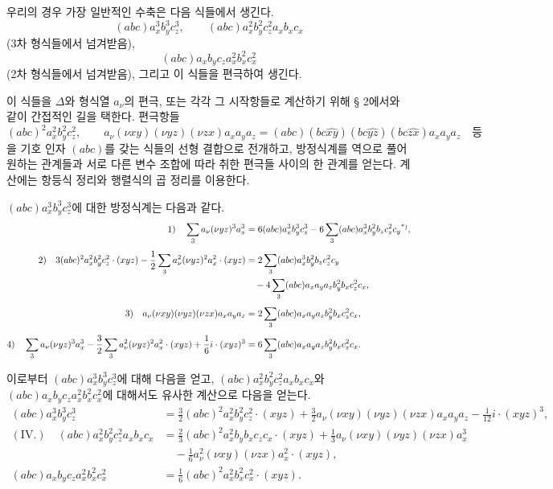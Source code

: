 우리의 경우 가장 일반적인 수축은 다음 식들에서 생긴다.
\[
(abc)a_x^3b_y^3c_z^3,
\qquad
(abc)a_x^2b_y^2c_z^2a_xb_xc_x
\]
(3차 형식들에서 넘겨받음),
\[
(abc)a_xb_yc_za_x^2b_x^2c_x^2
\]
(2차 형식들에서 넘겨받음), 그리고 이 식들을 편극하여 생긴다.

이 식들을 $\Delta$와 형식열 $a_\nu$의 편극, 또는 각각 그 시작항들로 계산하기 위해 § 2에서와 같이 간접적인 길을 택한다. 편극항들
\[
(abc)^2a_x^2b_y^2c_z^2,
\qquad
 a_\nu(\nu xy)(\nu yz)(\nu zx)a_xa_ya_z=(abc)(bc\widehat{xy})(bc\widehat{yz})(bc\widehat{zx})a_xa_ya_z\quad\text{등}
\]
을 기호 인자 $(abc)$를 갖는 식들의 선형 결합으로 전개하고, 방정식계를 역으로 풀어 원하는 관계들과 서로 다른 변수 조합에 따라 취한 편극들 사이의 한 관계를 얻는다. 계산에는 항등식 정리와 행렬식의 곱 정리를 이용한다.

$(abc)a_x^3b_y^3c_z^3$에 대한 방정식계는 다음과 같다.
\begingroup\small
\[
\begin{aligned}
1)\quad
\sum_3a_\nu(\nu yz)^3a_x^3
&=6(abc)a_x^3b_y^3c_z^3-6\sum_3(abc)a_x^3b_y^2b_zc_z^2c_y\srcfnmark{*)},\\[0.4em]
2)\quad
3(abc)^2a_x^2b_y^2c_z^2\cdot(xyz)-\frac12\sum_3a_\nu^2(\nu yz)^2a_x^2\cdot(xyz)
&=2\sum_3(abc)a_x^3b_y^2b_zc_z^2c_y\\
&\quad-4\sum_3(abc)a_xa_ya_zb_y^2b_xc_z^2c_x,\\[0.4em]
3)\quad
a_\nu(\nu xy)(\nu yz)(\nu zx)a_xa_ya_z
&=2\sum_3(abc)a_xa_ya_zb_y^2b_xc_z^2c_x,\\[0.4em]
4)\quad
\sum_3a_\nu(\nu yz)^3a_x^3-\frac32\sum_3a_\nu^2(\nu yz)^2a_x^2\cdot(xyz)+\frac16i\cdot(xyz)^3
&=6\sum_3(abc)a_xa_ya_zb_y^2b_xc_z^2c_x.
\end{aligned}
\]
\endgroup
{}

이로부터 $(abc)a_x^3b_y^3c_z^3$에 대해 다음을 얻고, $(abc)a_x^2b_y^2c_z^2a_xb_xc_x$와 $(abc)a_xb_yc_za_x^2b_x^2c_x^2$에 대해서도 유사한 계산으로 다음을 얻는다.
\[
\begin{aligned}
(abc)a_x^3b_y^3c_z^3
&=\frac32(abc)^2a_x^2b_y^2c_z^2\cdot(xyz)
+\frac32a_\nu(\nu xy)(\nu yz)(\nu zx)a_xa_ya_z
-\frac1{12}i\cdot(xyz)^3,\\[0.4em]
(\mathrm{IV}.)\quad
(abc)a_x^2b_y^2c_z^2a_xb_xc_x
&=\frac23(abc)^2a_x^2b_yb_xc_zc_x\cdot(xyz)
+\frac13a_\nu(\nu xy)(\nu yz)(\nu zx)a_x^3\\
&\quad-\frac16a_\nu^2(\nu xy)(\nu zx)a_x^2\cdot(xyz),\\[0.4em]
(abc)a_xb_yc_za_x^2b_x^2c_x^2
&=\frac16(abc)^2a_x^2b_x^2c_x^2\cdot(xyz).
\end{aligned}
\]

